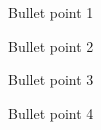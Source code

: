 

\begin{cventries}
\begin{cvitems}

		\item{Bullet point 1}
		\item{Bullet point 2}
		\item{Bullet point 3}
		\item{Bullet point 4}

\end{cvitems}
\end{cventries}
